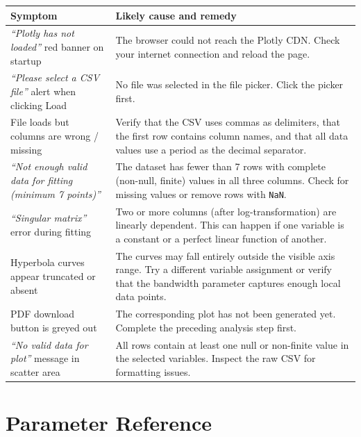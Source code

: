 \documentclass[12pt,a4paper]{article}
\begin{document}
\renewcommand{\arraystretch}{1.4}
\begin{longtable}{@{}p{5cm}p{9cm}@{}}
\toprule
\textbf{Symptom} & \textbf{Likely cause and remedy} \\
\midrule
\endhead
\bottomrule
\endfoot
\textit{``Plotly has not loaded''} red banner on startup &
    The browser could not reach the Plotly CDN.  Check your internet connection and
    reload the page. \\
\textit{``Please select a CSV file''} alert when clicking Load &
    No file was selected in the file picker.  Click the picker first. \\
File loads but columns are wrong / missing &
    Verify that the CSV uses commas as delimiters, that the first row contains
    column names, and that all data values use a period as the decimal separator. \\
\textit{``Not enough valid data for fitting (minimum 7 points)''} &
    The dataset has fewer than 7 rows with complete (non-null, finite) values in
    all three columns.  Check for missing values or remove rows with \texttt{NaN}. \\
\textit{``Singular matrix''} error during fitting &
    Two or more columns (after log-transformation) are linearly dependent.  This
    can happen if one variable is a constant or a perfect linear function of
    another. \\
Hyperbola curves appear truncated or absent &
    The curves may fall entirely outside the visible axis range.  Try a different
    variable assignment or verify that the bandwidth parameter captures enough
    local data points. \\
PDF download button is greyed out &
    The corresponding plot has not been generated yet.  Complete the preceding
    analysis step first. \\
\textit{``No valid data for plot''} message in scatter area &
    All rows contain at least one null or non-finite value in the selected
    variables.  Inspect the raw CSV for formatting issues. \\
\end{longtable}

\section{Parameter Reference}
\end{document}
